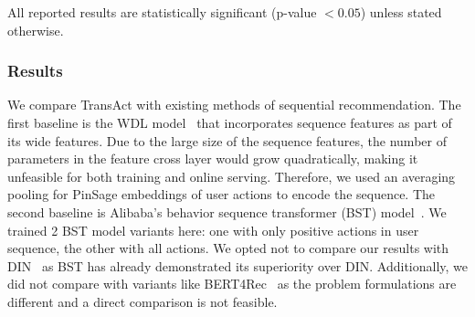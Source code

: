 All reported results are statistically significant (p-value $ < 0.05$) unless stated otherwise.
\subsubsection{Results}



\begin{table}
\caption{Offline evaluation of comparing existing methods with TransAct. ($^*$ statistically insignificant)} \label{tab:offline_res}
\end{table}

We compare TransAct with existing methods of sequential recommendation. 
The first baseline is the WDL model~\cite{cheng2016wide} that incorporates sequence features as part of its wide features. Due to the large size of the sequence features, the number of parameters in the feature cross layer would grow quadratically, making it unfeasible for both training and online serving. 
Therefore, we used an averaging pooling for PinSage embeddings of user actions to encode the sequence.
The second baseline is Alibaba's behavior sequence transformer (BST) model~\cite{alibaba_seq_tfmr}. 
We trained 2 BST model variants here: one with only positive actions in user sequence, the other with all actions. 
We opted not to compare our results with DIN~\cite{DIN} as BST has already demonstrated its superiority over DIN. Additionally, we did not compare with variants like BERT4Rec~\cite{BERT4Rec} as the problem formulations are different and a direct comparison is not feasible.



